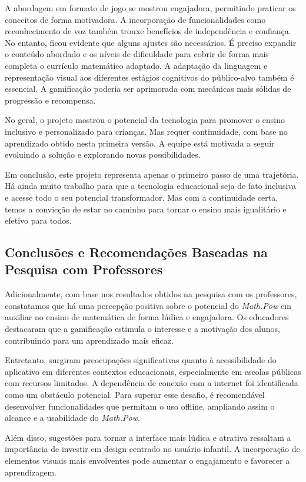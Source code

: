 A abordagem em formato de jogo se mostrou engajadora, permitindo praticar os conceitos de forma motivadora. A incorporação de funcionalidades como reconhecimento de voz também trouxe benefícios de independência e confiança. No entanto, ficou evidente que alguns ajustes são necessários. É preciso expandir o conteúdo abordado e os níveis de dificuldade para cobrir de forma mais completa o currículo matemático adaptado. A adaptação da linguagem e representação visual aos diferentes estágios cognitivos do público-alvo também é essencial. A gamificação poderia ser aprimorada com mecânicas mais sólidas de progressão e recompensa.

No geral, o projeto mostrou o potencial da tecnologia para promover o ensino inclusivo e personalizado para crianças. Mas requer continuidade, com base no aprendizado obtido nesta primeira versão. A equipe está motivada a seguir evoluindo a solução e explorando novas possibilidades.

Em conclusão, este projeto representa apenas o primeiro passo de uma trajetória. Há ainda muito trabalho para que a tecnologia educacional seja de fato inclusiva e acesse todo o seu potencial transformador. Mas com a continuidade certa, temos a convicção de estar no caminho para tornar o ensino mais igualitário e efetivo para todos.

\subsection{Conclusões e Recomendações Baseadas na Pesquisa com Professores}

Adicionalmente, com base nos resultados obtidos na pesquisa com os professores, constatamos que há uma percepção positiva sobre o potencial do \textit{Math.Pow} em auxiliar no ensino de matemática de forma lúdica e engajadora. Os educadores destacaram que a gamificação estimula o interesse e a motivação dos alunos, contribuindo para um aprendizado mais eficaz.

Entretanto, surgiram preocupações significativas quanto à acessibilidade do aplicativo em diferentes contextos educacionais, especialmente em escolas públicas com recursos limitados. A dependência de conexão com a internet foi identificada como um obstáculo potencial. Para superar esse desafio, é recomendável desenvolver funcionalidades que permitam o uso offline, ampliando assim o alcance e a usabilidade do \textit{Math.Pow}.

Além disso, sugestões para tornar a interface mais lúdica e atrativa ressaltam a importância de investir em design centrado no usuário infantil. A incorporação de elementos visuais mais envolventes pode aumentar o engajamento e favorecer a aprendizagem.

